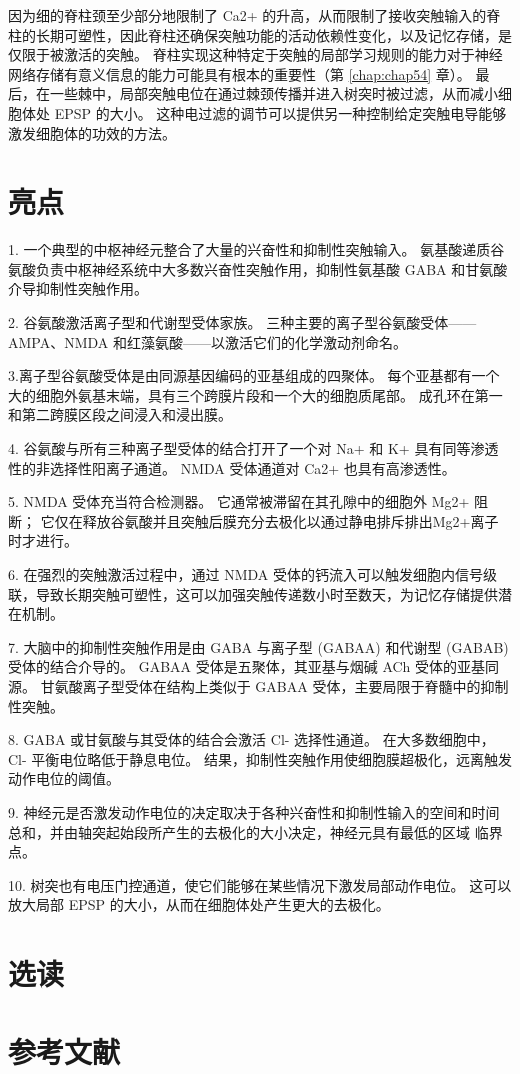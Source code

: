 因为细的脊柱颈至少部分地限制了 Ca2+ 的升高，从而限制了接收突触输入的脊柱的长期可塑性，因此脊柱还确保突触功能的活动依赖性变化，以及记忆存储，是 仅限于被激活的突触。
脊柱实现这种特定于突触的局部学习规则的能力对于神经网络存储有意义信息的能力可能具有根本的重要性（第 \ref{chap:chap54} 章）。
最后，在一些棘中，局部突触电位在通过棘颈传播并进入树突时被过滤，从而减小细胞体处 EPSP 的大小。
这种电过滤的调节可以提供另一种控制给定突触电导能够激发细胞体的功效的方法。



\section{亮点}

1. 一个典型的中枢神经元整合了大量的兴奋性和抑制性突触输入。
氨基酸递质谷氨酸负责中枢神经系统中大多数兴奋性突触作用，抑制性氨基酸 GABA 和甘氨酸介导抑制性突触作用。 


2. 谷氨酸激活离子型和代谢型受体家族。
三种主要的离子型谷氨酸受体——AMPA、NMDA 和红藻氨酸——以激活它们的化学激动剂命名。 


3.离子型谷氨酸受体是由同源基因编码的亚基组成的四聚体。
每个亚基都有一个大的细胞外氨基末端，具有三个跨膜片段和一个大的细胞质尾部。
成孔环在第一和第二跨膜区段之间浸入和浸出膜。 


4. 谷氨酸与所有三种离子型受体的结合打开了一个对 Na+ 和 K+ 具有同等渗透性的非选择性阳离子通道。 
NMDA 受体通道对 Ca2+ 也具有高渗透性。


5. NMDA 受体充当符合检测器。
它通常被滞留在其孔隙中的细胞外 Mg2+ 阻断； 它仅在释放谷氨酸并且突触后膜充分去极化以通过静电排斥排出Mg2+离子时才进行。 


6. 在强烈的突触激活过程中，通过 NMDA 受体的钙流入可以触发细胞内信号级联，导致长期突触可塑性，这可以加强突触传递数小时至数天，为记忆存储提供潜在机制。 


7. 大脑中的抑制性突触作用是由 GABA 与离子型 (GABAA) 和代谢型 (GABAB) 受体的结合介导的。 
GABAA 受体是五聚体，其亚基与烟碱 ACh 受体的亚基同源。 甘氨酸离子型受体在结构上类似于 GABAA 受体，主要局限于脊髓中的抑制性突触。 


8. GABA 或甘氨酸与其受体的结合会激活 Cl- 选择性通道。 
在大多数细胞中，Cl- 平衡电位略低于静息电位。 结果，抑制性突触作用使细胞膜超极化，远离触发动作电位的阈值。 


9. 神经元是否激发动作电位的决定取决于各种兴奋性和抑制性输入的空间和时间总和，并由轴突起始段所产生的去极化的大小决定，神经元具有最低的区域 临界点。 


10. 树突也有电压门控通道，使它们能够在某些情况下激发局部动作电位。
这可以放大局部 EPSP 的大小，从而在细胞体处产生更大的去极化。


\section{选读}

\section{参考文献}




